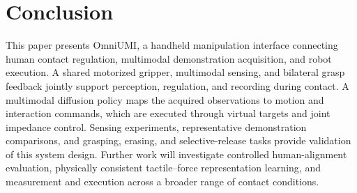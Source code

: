 \section{Conclusion}
\label{sec:conclusion}

This paper presents OmniUMI, a handheld manipulation interface connecting human contact regulation, multimodal demonstration acquisition, and robot execution.
A shared motorized gripper, multimodal sensing, and bilateral grasp feedback jointly support perception, regulation, and recording during contact.
A multimodal diffusion policy maps the acquired observations to motion and interaction commands, which are executed through virtual targets and joint impedance control.
Sensing experiments, representative demonstration comparisons, and grasping, erasing, and selective-release tasks provide validation of this system design.
Further work will investigate controlled human-alignment evaluation, physically consistent tactile--force representation learning, and measurement and execution across a broader range of contact conditions.
